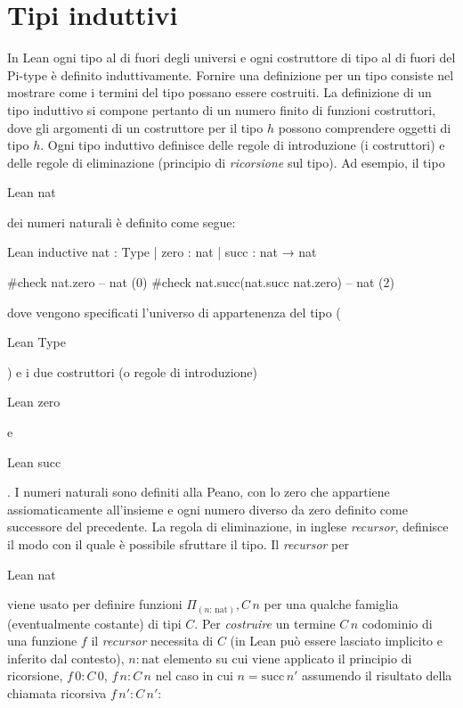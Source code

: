 \section{Tipi induttivi} \label{tind}
In Lean ogni tipo al di fuori degli universi e ogni costruttore di tipo al di fuori del Pi-type è definito induttivamente. Fornire una definizione per un tipo consiste nel mostrare come i termini del tipo possano essere costruiti. La definizione di un tipo induttivo si compone pertanto di un numero finito di funzioni costruttori, dove gli argomenti di un costruttore per il tipo $h$ possono comprendere oggetti di tipo $h$. Ogni tipo induttivo definisce delle regole di introduzione (i costruttori) e delle regole di eliminazione (principio di \emph{ricorsione} sul tipo). Ad esempio, il tipo \begin{mintinline}{Lean} nat \end{mintinline} dei numeri naturali è definito come segue:
\begin{code}{Lean}
inductive nat : Type
| zero : nat
| succ : nat → nat

#check nat.zero -- nat (0)
#check nat.succ(nat.succ nat.zero) -- nat (2)
\end{code}
dove vengono specificati l'universo di appartenenza del tipo (\begin{mintinline}{Lean} Type \end{mintinline}) e i due costruttori (o regole di introduzione) \begin{mintinline}{Lean} zero \end{mintinline} e \begin{mintinline}{Lean} succ \end{mintinline}. I numeri naturali sono definiti alla Peano, con lo zero che appartiene assiomaticamente all'insieme e ogni numero diverso da zero definito come successore del precedente.
La regola di eliminazione, in inglese \emph{recursor}, definisce il modo con il quale è possibile sfruttare il tipo. Il \emph{recursor} per \begin{mintinline}{Lean} nat \end{mintinline} viene usato per definire funzioni $\Pi_{(n :\,\text{nat})}, C\,n$ per una qualche famiglia (eventualmente costante) di tipi $C$.
Per \emph{costruire} un termine $C\,n$ codominio di una funzione $f$ il \emph{recursor} necessita di $C$ (in Lean può essere lasciato implicito e inferito dal contesto), $n : \text{nat}$ elemento su cui viene applicato il principio di ricorsione, $f\,0 : C\,0$, $f\,n : C\,n$ nel caso in cui $n = \text{succ}\,n'$  assumendo il risultato della chiamata ricorsiva $f\,n' : C\,n'$:

